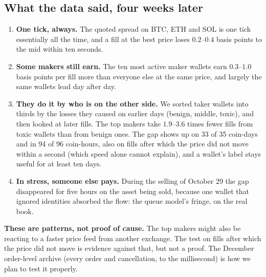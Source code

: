 \documentclass[11pt]{article}
\begin{document}
\subsection{What the data said, four weeks later}
\begin{enumerate}
\item \textbf{One tick, always.} The quoted spread on BTC, ETH and SOL is one tick essentially all the
time, and a fill at the best price loses $0.2$--$0.4$ basis points to the mid within ten seconds.
\item \textbf{Some makers still earn.} The ten most active maker wallets earn $0.3$--$1.0$ basis points
per fill more than everyone else at the same price, and largely the same wallets lead day after day.
\item \textbf{They do it by who is on the other side.} We sorted taker wallets into thirds by the losses
they caused on earlier days (benign, middle, toxic), and then looked at later fills. The top makers take
$1.9$--$3.6$ times fewer fills from toxic wallets than from benign ones. The gap shows up on 33 of 35
coin-days and in 94 of 96 coin-hours, also on fills after which the price did not move within a
second (which speed alone cannot explain), and a wallet's label stays useful for at least ten days.
\item \textbf{In stress, someone else pays.} During the selling of October 29 the gap disappeared for five
hours on the asset being sold, because one wallet that ignored identities absorbed the flow: the
queue model's fringe, on the real book.
\end{enumerate}
\begin{warning}
\textbf{These are patterns, not proof of cause.} The top makers might also be reacting to a faster price
feed from another exchange. The test on fills after which the price did not move is evidence against
that, but not a proof. The December order-level archive (every order and cancellation, to the
millisecond) is how we plan to test it properly.
\end{warning}
\end{document}
